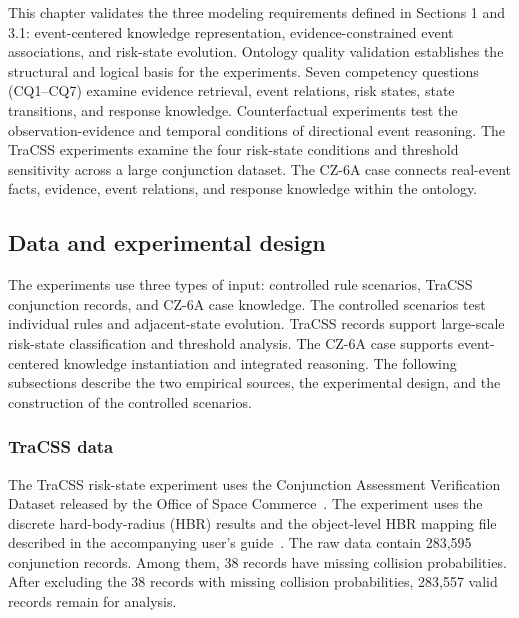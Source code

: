 \documentclass[Royal,sageh,times]{sagej}
\begin{document}
This chapter validates the three modeling requirements defined in Sections 1 and 3.1: event-centered knowledge representation, evidence-constrained event associations, and risk-state evolution. Ontology quality validation establishes the structural and logical basis for the experiments. Seven competency questions (CQ1--CQ7) examine evidence retrieval, event relations, risk states, state transitions, and response knowledge. Counterfactual experiments test the observation-evidence and temporal conditions of directional event reasoning. The TraCSS experiments examine the four risk-state conditions and threshold sensitivity across a large conjunction dataset. The CZ-6A case connects real-event facts, evidence, event relations, and response knowledge within the ontology.

\subsection{Data and experimental design}
\label{sec:experimental-design}

The experiments use three types of input: controlled rule scenarios, TraCSS conjunction records, and CZ-6A case knowledge. The controlled scenarios test individual rules and adjacent-state evolution. TraCSS records support large-scale risk-state classification and threshold analysis. The CZ-6A case supports event-centered knowledge instantiation and integrated reasoning. The following subsections describe the two empirical sources, the experimental design, and the construction of the controlled scenarios.

\subsubsection{TraCSS data}
\label{sec:tracss-data}

The TraCSS risk-state experiment uses the Conjunction Assessment Verification Dataset released by the Office of Space Commerce~\citep{tracss_dataset}. The experiment uses the discrete hard-body-radius (HBR) results and the object-level HBR mapping file described in the accompanying user's guide~\citep{tracss_users_guide}. The raw data contain 283,595 conjunction records. Among them, 38 records have missing collision probabilities. After excluding the 38 records with missing collision probabilities, 283,557 valid records remain for analysis.
\end{document}
